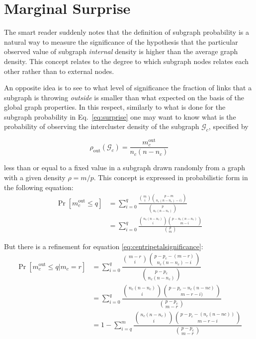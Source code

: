 \section{Marginal Surprise}
The smart reader suddenly notes that the definition of subgraph probability is a natural way to measure the significance of the hypothesis that the particular observed value of subgraph \emph{internal} density is higher than the average graph density.
This concept relates to the degree to which subgraph nodes relates each other rather than to external nodes.

An opposite idea is to see to what level of significance the fraction of links that a subgraph is throwing \emph{outside} is smaller than what expected on the basis of the global graph properties.
In this respect, similarly to what is done for the subgraph probability in Eq.~\ref{eq:surprise} one may want to know what is the probability of observing the intercluster density of the subgraph $\mathcal{G}_c$, specified by

\begin{equation}
\rho_{\textrm{out}}(\mathcal{G}_c)=\frac{m_c^{\textrm{out}}}{n_c(n-n_c)}
\end{equation}

less than or equal to a fixed value in a subgraph drawn randomly from a graph with a given density $\rho=m/p$.
This concept is expressed in probabilistic form in the following equation:
\begin{align}\label{eq:centripetalsignificance}
\Pr[m^{\textrm{out}}_c \leq q ] &= \sum \limits_{i=0}^{q} \frac{\binom{m}{i}\binom{p-m}{n_c(n-n_c)-i)}}{\binom{p}{n_c(n-n_c)}} \nonumber \\ 
& = \sum \limits_{i=0}^{q} \frac{\binom{n_c(n-n_c)}{i}\binom{p-n_c(n-n_c)}{m-i}}{\binom{p}{m}}
\end{align}

But there is a refinement for equation \ref{eq:centripetalsignificance}:
\begin{align}
\Pr[m^{\textrm{out}}_c \leq q | m_c =r] &= \sum \limits_{i=0}^{q} \dfrac{\binom{m-r}{i} \binom{p-p_c - (m-r)}{n_c(n-n_c) - i}}{\binom{p-p_c}{n_c(n-n_c)}} \\
 &=  \sum \limits_{i=0}^{q} \dfrac{\binom{n_c(n-n_c)}{i}\binom{p-p_c-n_c(n-nc)}{m-r-i)}}{\binom{p-p_c}{m-r}}\\
  &=  1- \sum \limits_{i=q}^{m} \dfrac{\binom{n_c(n-n_c)}{i}\binom{p-p_c-(n_c(n-nc))}{m-r-i}}{\binom{p-p_c}{m-r}}
\end{align}

